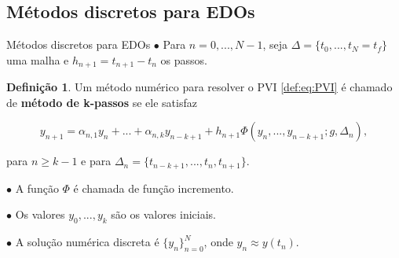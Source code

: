 \documentclass{beamer}
\theoremstyle{plain}
\theoremstyle{definition}
\newtheorem{defi}{Definição}
\begin{document}


\subsection{Métodos discretos para EDOs}


\begin{frame}{Métodos discretos para EDOs}
    \small
    \phantom{aa} $\bullet$ Para $n = 0, ..., N-1$, seja $\Delta = \{ t_0, ..., t_N = t_f\}$ uma malha e $h_{n+1} = t_{n+1} - t_n$ os passos.

    \begin{defi}
        Um método numérico para resolver o PVI \eqref{def:eq:PVI} é chamado de \textbf{método de k-passos} se ele satisfaz 

        \vspace{-0.3cm}
        \begin{equation}
            y_{n+1} = \alpha_{n, 1} y_n + ... + \alpha_{n, k} y_{n - k + 1} + h_{n+1} \Phi( y_n, ..., y_{n-k+1}; g, \Delta_n), 
            \label{chap3:def:eq:ODE_method}
        \end{equation}

        para $n \geq k - 1$ e para $\Delta_n = \{ t_{n - k + 1}, ..., t_n, t_{n+1}\} $.

    \end{defi}

    \phantom{aa} $\bullet$ A função $\Phi$ é chamada de função incremento.

    \phantom{aa} $\bullet$ Os valores $y_0, ..., y_k$ são os valores iniciais.

    \phantom{aa} $\bullet$ A solução numérica discreta é $\{y_{n}\}_{n=0}^{N}$, onde  $y_{n} \approx y(t_{n})$.


\end{frame}

\end{document}
